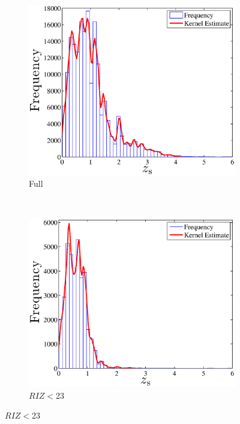 \documentclass[useAMS,usenatbib,fleqn]{mn2e}
\begin{document}
\begin{figure}
        \centering
        \begin{subfigure}[b]{1\columnwidth}
                 \includegraphics[width=\textwidth]{figures/zspec}
                 \caption{Full}
        \end{subfigure}
        ~
        \begin{subfigure}[b]{1\columnwidth}
                 \includegraphics[width=\textwidth]{figures/zspec_23}
                 \caption{$RIZ<$23}
        \end{subfigure}

\end{figure}
\end{document}
